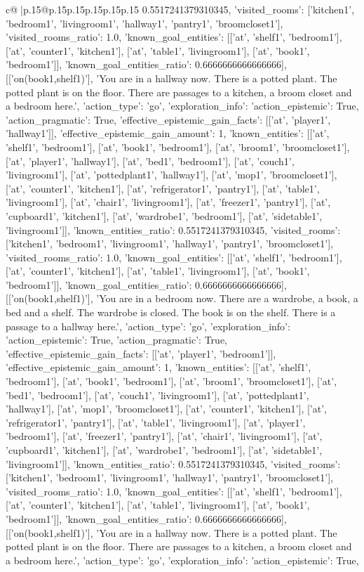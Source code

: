 \documentclass{article}
\begin{document}
{\begin{supertabular}{c@{$\;$}|p{.15\linewidth}@{}p{.15\linewidth}p{.15\linewidth}p{.15\linewidth}p{.15\linewidth}p{.15\linewidth}}
{{{0.5517241379310345, 'visited_rooms': ['kitchen1', 'bedroom1', 'livingroom1', 'hallway1', 'pantry1', 'broomcloset1'], 'visited_rooms_ratio': 1.0, 'known_goal_entities': [['at', 'shelf1', 'bedroom1'], ['at', 'counter1', 'kitchen1'], ['at', 'table1', 'livingroom1'], ['at', 'book1', 'bedroom1']], 'known_goal_entities_ratio': 0.6666666666666666}}], [['on(book1,shelf1)'], 'You are in a hallway now. There is a potted plant. The potted plant is on the floor. There are passages to a kitchen, a broom closet and a bedroom here.', {'action_type': 'go', 'exploration_info': {'action_epistemic': True, 'action_pragmatic': True, 'effective_epistemic_gain_facts': [['at', 'player1', 'hallway1']], 'effective_epistemic_gain_amount': 1, 'known_entities': [['at', 'shelf1', 'bedroom1'], ['at', 'book1', 'bedroom1'], ['at', 'broom1', 'broomcloset1'], ['at', 'player1', 'hallway1'], ['at', 'bed1', 'bedroom1'], ['at', 'couch1', 'livingroom1'], ['at', 'pottedplant1', 'hallway1'], ['at', 'mop1', 'broomcloset1'], ['at', 'counter1', 'kitchen1'], ['at', 'refrigerator1', 'pantry1'], ['at', 'table1', 'livingroom1'], ['at', 'chair1', 'livingroom1'], ['at', 'freezer1', 'pantry1'], ['at', 'cupboard1', 'kitchen1'], ['at', 'wardrobe1', 'bedroom1'], ['at', 'sidetable1', 'livingroom1']], 'known_entities_ratio': 0.5517241379310345, 'visited_rooms': ['kitchen1', 'bedroom1', 'livingroom1', 'hallway1', 'pantry1', 'broomcloset1'], 'visited_rooms_ratio': 1.0, 'known_goal_entities': [['at', 'shelf1', 'bedroom1'], ['at', 'counter1', 'kitchen1'], ['at', 'table1', 'livingroom1'], ['at', 'book1', 'bedroom1']], 'known_goal_entities_ratio': 0.6666666666666666}}], [['on(book1,shelf1)'], 'You are in a bedroom now. There are a wardrobe, a book, a bed and a shelf. The wardrobe is closed. The book is on the shelf. There is a passage to a hallway here.', {'action_type': 'go', 'exploration_info': {'action_epistemic': True, 'action_pragmatic': True, 'effective_epistemic_gain_facts': [['at', 'player1', 'bedroom1']], 'effective_epistemic_gain_amount': 1, 'known_entities': [['at', 'shelf1', 'bedroom1'], ['at', 'book1', 'bedroom1'], ['at', 'broom1', 'broomcloset1'], ['at', 'bed1', 'bedroom1'], ['at', 'couch1', 'livingroom1'], ['at', 'pottedplant1', 'hallway1'], ['at', 'mop1', 'broomcloset1'], ['at', 'counter1', 'kitchen1'], ['at', 'refrigerator1', 'pantry1'], ['at', 'table1', 'livingroom1'], ['at', 'player1', 'bedroom1'], ['at', 'freezer1', 'pantry1'], ['at', 'chair1', 'livingroom1'], ['at', 'cupboard1', 'kitchen1'], ['at', 'wardrobe1', 'bedroom1'], ['at', 'sidetable1', 'livingroom1']], 'known_entities_ratio': 0.5517241379310345, 'visited_rooms': ['kitchen1', 'bedroom1', 'livingroom1', 'hallway1', 'pantry1', 'broomcloset1'], 'visited_rooms_ratio': 1.0, 'known_goal_entities': [['at', 'shelf1', 'bedroom1'], ['at', 'counter1', 'kitchen1'], ['at', 'table1', 'livingroom1'], ['at', 'book1', 'bedroom1']], 'known_goal_entities_ratio': 0.6666666666666666}}], [['on(book1,shelf1)'], 'You are in a hallway now. There is a potted plant. The potted plant is on the floor. There are passages to a kitchen, a broom closet and a bedroom here.', {'action_type': 'go', 'exploration_info': {'action_epistemic': True, }}}
\end{supertabular}}
\end{document}
